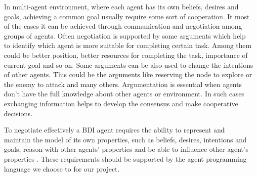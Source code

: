 In multi-agent environment, where each agent has its own beliefs, desires and goals, achieving a common goal usually require some sort of cooperation. It most of the cases it can be achieved through communication and negotiation among groups of agents. Often negotiation is supported by some arguments which help to identify which agent is more suitable for completing certain task. Among them could be better position, better resources for completing the task, importance of current goal and so on. Some arguments can be also used to change the intentions of other agents. This could be the arguments like reserving the node to explore or the enemy to attack and many others. Argumentation is essential when agents don't have the full knowledge about other agents or environment. In such cases exchanging information helps to develop the consensus and make cooperative decisions.

To negotiate effectively a BDI agent requires the ability to represent and maintain the model of its own properties, such as beliefs, desires, intentions and goals, reason with other agents' properties and be able to influence other agent's properties \cite{Kraus_98}. These requirements should be supported by the agent programming language we choose to for our project. 